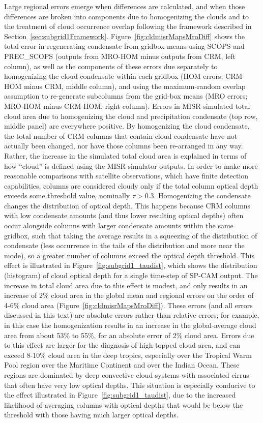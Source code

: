 Large regional errors emerge when differences are calculated, and when
those differences are broken into components due to homogenizing the
clouds and to the treatment of cloud occurrence overlap following the
framework described in Section~\ref{sec:subgrid1Framework}.
Figure~\ref{fig:cldmisrMapsMroDiff} shows the total error in
regenerating condensate from gridbox-means using SCOPS and PREC\_SCOPS
(outputs from MRO-HOM minus outputs from CRM, left column), as well as
the components of these errors due separately to homogenizing the cloud
condensate within each gridbox (HOM errors; CRM-HOM minus CRM, middle
column), and using the maximum-random overlap assumption to re-generate
subcolumns from the grid-box means (MRO errors; MRO-HOM minus CRM-HOM,
right column). Errors in MISR-simulated total cloud area due to
homogenizing the cloud and precipitation condensate (top row, middle
panel) are everywhere positive. By homogenizing the cloud condensate,
the total number of CRM columns that contain cloud condensate have not
actually been changed, nor have those columns been re-arranged in any
way. Rather, the increase in the simulated total cloud area is explained
in terms of how ``cloud'' is defined using the MISR simulator outputs.
In order to make more reasonable comparisons with satellite
observations, which have finite detection capabilities, columns are
considered cloudy only if the total column optical depth exceeds some
threshold value, nominally \(\tau > 0.3\). Homogenizing the condensate
changes the distribution of optical depth. This happens because CRM
columns with low condensate amounts (and thus lower resulting optical
depths) often occur alongside columns with larger condensate amounts
within the same gridbox, such that taking the average results in a
squeezing of the distribution of condensate (less occurrence in the
tails of the distribution and more near the mode), so a greater number
of columns exceed the optical depth threshold. This effect is
illustrated in Figure~\ref{fig:subgrid1_taudist}, which shows the
distribution (histogram) of cloud optical depth for a single time-step
of SP-CAM output. The increase in total cloud area due to this effect is
modest, and only results in an increase of 2\% cloud area in the global
mean and regional errors on the order of 4-6\% cloud area
(Figure~\ref{fig:cldmisrMapsMroDiff}). These errors (and all errors
discussed in this text) are absolute errors rather than relative errors;
for example, in this case the homogenization results in an increase in
the global-average cloud area from about 53\% to 55\%, for an absolute
error of 2\% cloud area. Errors due to this effect are larger for the
diagnosis of high-topped cloud area, and can exceed 8-10\% cloud area in
the deep tropics, especially over the Tropical Warm Pool region over the
Maritime Continent and over the Indian Ocean. These regions are
dominated by deep convective cloud systems with associated cirrus that
often have very low optical depths. This situation is especially
conducive to the effect illustrated in
Figure~\ref{fig:subgrid1_taudist}, due to the increased likelihood of
averaging columns with optical depths that would be below the threshold
with those having much larger optical depths.

